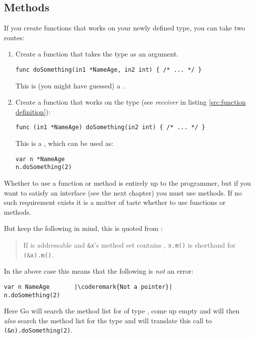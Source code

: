 \subsection{Methods}
\label{sec:methods}
If you create functions that works on your newly defined type, you can
take two routes:
\begin{enumerate}
\item Create a function that takes the type as an argument.
\begin{lstlisting}
func doSomething(in1 *NameAge, in2 int) { /* ... */ }
\end{lstlisting}
This is (you might have guessed) a .
\item Create a function that works on the type (see \emph{receiver} in
listing \ref{src:function definition}):
\begin{lstlisting}
func (in1 *NameAge) doSomething(in2 int) { /* ... */ }
\end{lstlisting}
This is a , which can be
used as: 
\begin{lstlisting}
var n *NameAge
n.doSomething(2)
\end{lstlisting}
\end{enumerate}
Whether to use a function or method is entirely up to the programmer, but
if you want to satisfy an interface (see the next chapter) you must use
methods. If no such requirement exists it is a matter of taste whether
to use functions or methods.

But keep the following in mind, this is quoted from \cite{go_spec}:
\begin{quote}
If  is
addressable and \lstinline{&x}'s method set contains , 
\lstinline{x.m()} is shorthand for \lstinline{(&x).m()}.
\end{quote}
In the above case this means that the following is \emph{not} an 
error:
\begin{lstlisting}
var n NameAge	    |\coderemark{Not a pointer}|
n.doSomething(2)    
\end{lstlisting}
Here Go will search the method list for  of type ,
come up empty and will then \emph{also} search the method list for
the type  and will translate this call to
\lstinline{(&n).doSomething(2)}.

